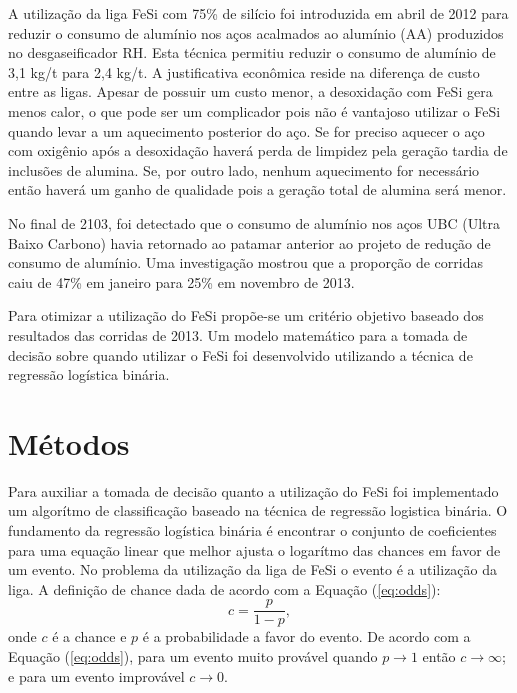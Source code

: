 \pagestyle{plain}
\setcounter{page}{1}
	A utilização da liga FeSi com 75\% de silício foi introduzida em abril de 2012 para reduzir o consumo de alumínio nos aços acalmados ao alumínio (AA) produzidos no desgaseificador RH. Esta técnica permitiu reduzir o consumo de alumínio de 3,1 kg/t para 2,4 kg/t\cite{follow12}. A justificativa econômica reside na diferença de custo entre as ligas. Apesar de possuir um custo menor, a desoxidação com FeSi gera menos calor, o que pode ser um complicador pois não é vantajoso utilizar o FeSi quando levar a um aquecimento posterior do aço. Se for preciso aquecer o aço com oxigênio após a desoxidação haverá perda de limpidez pela geração tardia de inclusões de alumina. Se, por outro lado, nenhum aquecimento for necessário então haverá um ganho de qualidade pois a geração total de alumina será menor.
	
	No final de 2103, foi detectado que o consumo de alumínio nos aços UBC (Ultra Baixo Carbono) havia retornado ao patamar anterior ao projeto de redução de consumo de alumínio\cite{repnov}. Uma investigação \cite{prop} mostrou que a proporção de corridas caiu de 47\% em janeiro para 25\% em novembro de 2013. 
	
	Para otimizar a utilização do FeSi propõe-se um critério objetivo baseado dos resultados das corridas de 2013. Um modelo matemático para a tomada de decisão sobre quando utilizar o FeSi foi desenvolvido utilizando a técnica de regressão logística binária. 
\section{Métodos}		
	Para auxiliar a tomada de decisão quanto a utilização do FeSi foi implementado um algorítmo de classificação baseado na técnica de regressão logistica binária\cite{wiki:lr}. O fundamento da regressão logística binária é encontrar o conjunto de coeficientes para uma equação linear que melhor ajusta o logarítmo das chances em favor de um evento. No problema da utilização da liga de FeSi o evento é a utilização da liga. A definição de chance dada de acordo com a Equação (\ref{eq:odds}):	
	\begin{equation}
		\label{eq:odds}
		c = \frac{p}{1-p},
	\end{equation}
	\noindent onde $c$ é a chance e $p$ é a probabilidade a favor do evento. De acordo com a Equação (\ref{eq:odds}), para um evento muito provável quando $p \rightarrow 1$ então $c \rightarrow \infty$; e para um evento improvável $ c \rightarrow 0$. 
	
